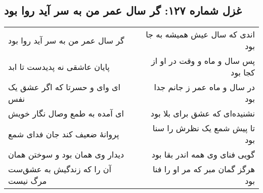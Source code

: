\begin{center}
\section*{غزل شماره ۱۲۷: گر سال عمر من به سر آید روا بود}
\label{sec:127}
\begin{longtable}{l p{0.5cm} r}
گر سال عمر من به سر آید روا بود
&&
اندی که سال عیش همیشه به جا بود
\\
پایان عاشقی نه پدیدست تا ابد
&&
پس سال و ماه و وقت در او از کجا بود
\\
ای وای و حسرتا که اگر عشق یک نفس
&&
در سال و ماه عمر ز جانم جدا بود
\\
ای آمده به طمع وصال نگار خویش
&&
نشنیده‌ای که عشق برای بلا بود
\\
پروانهٔ ضعیف کند جان فدای شمع
&&
تا پیش شمع یک نظرش را سنا بود
\\
دیدار وی همان بود و سوختن همان
&&
گویی فنای وی همه اندر بقا بود
\\
آن را که زندگیش به عشق‌ست مرگ نیست
&&
هرگز گمان مبر که مر او را فنا بود
\\
\end{longtable}
\end{center}
